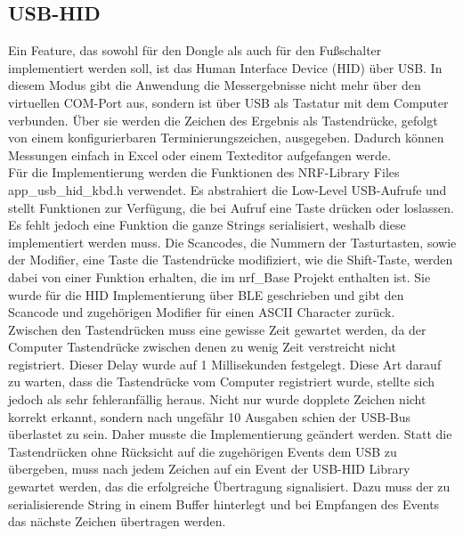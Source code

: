 \subsection{USB-HID}
Ein Feature, das sowohl für den Dongle als auch für den Fußschalter implementiert werden soll, ist das Human Interface Device (HID) über USB. In diesem Modus gibt die Anwendung die Messergebnisse nicht mehr über den virtuellen COM-Port aus, sondern ist über USB als Tastatur mit dem Computer verbunden. Über sie werden die Zeichen des Ergebnis als Tastendrücke, gefolgt von einem konfigurierbaren Terminierungszeichen, ausgegeben. Dadurch können Messungen einfach in Excel oder einem Texteditor aufgefangen werde.\\
Für die Implementierung werden die Funktionen des NRF-Library Files app\_usb\_hid\_kbd.h verwendet. Es abstrahiert die Low-Level USB-Aufrufe und stellt Funktionen zur Verfügung, die bei Aufruf eine Taste drücken oder loslassen. Es fehlt jedoch eine Funktion die ganze Strings serialisiert, weshalb diese implementiert werden muss. Die Scancodes, die Nummern der Tasturtasten, sowie der Modifier, eine Taste die Tastendrücke modifiziert, wie die Shift-Taste, werden dabei von einer Funktion erhalten, die im nrf\_Base Projekt enthalten ist. Sie wurde für die HID Implementierung über BLE geschrieben und gibt den Scancode und zugehörigen Modifier für einen ASCII Character zurück.\\
Zwischen den Tastendrücken muss eine gewisse Zeit gewartet werden, da der Computer Tastendrücke zwischen denen zu wenig Zeit verstreicht nicht registriert. Dieser Delay wurde auf 1 Millisekunden festgelegt. Diese Art darauf zu warten, dass die Tastendrücke vom Computer registriert wurde, stellte sich jedoch als sehr fehleranfällig heraus. Nicht nur wurde dopplete Zeichen nicht korrekt erkannt, sondern nach ungefähr 10 Ausgaben schien der USB-Bus überlastet zu sein. Daher musste die Implementierung geändert werden. Statt die Tastendrücken ohne Rücksicht auf die zugehörigen Events dem USB zu übergeben, muss nach jedem Zeichen auf ein Event der USB-HID Library gewartet werden, das die erfolgreiche Übertragung signalisiert. Dazu muss der zu serialisierende String in einem Buffer hinterlegt und bei Empfangen des Events das nächste Zeichen übertragen werden.


